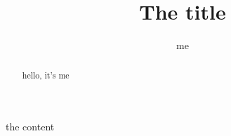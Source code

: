 \documentclass{ximera}
\title{The title}
\author{me}
\begin{document}
\begin{abstract}
hello, it's me
\end{abstract}
\maketitle

the content
\end{document}
